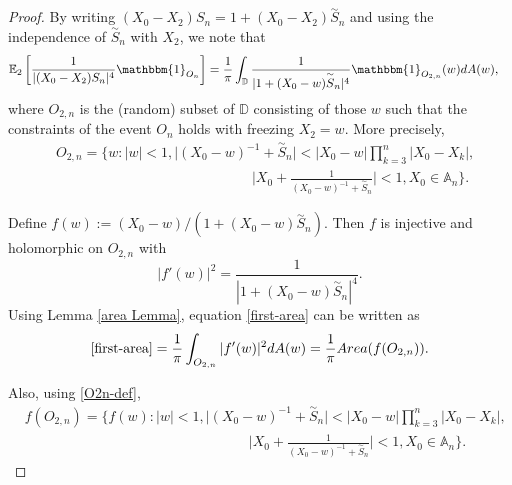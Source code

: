 \documentclass[9pt,a4paper,reqno]{amsart}
\newcommand{\E}{{\mathbb{E}}}
\newcommand{\tildea}[1]{\overset{\sim}{#1}}
\theoremstyle{mine}
\theoremstyle{definition}
\theoremstyle{remark}
\newcommand{\mb}{\mathbb}
\begin{document}
\begin{proof}
     By writing $(X_0 - X_2)S_n = 1 + (X_0 - X_2)\tildea{S}_n$ and using the independence of $\tildea{S}_n$ with $X_2$, we note that  
\begin{align}\label{first-area}
         \E_2\left[\frac{1}{|(X_0-X_2)S_n|^4} \mathbbm{1}_{O_n}\right] &= \frac{1}{\pi}\int_{\mathbb{D}} \frac{1}{|1+(X_0-w)\tildea{S}_n|^4}\mathbbm{1}_{O_{2,n}}(w)dA(w),
    \end{align}
where $O_{2,n}$ is the (random) subset of $\mb{D}$ consisting of those $w$ such that the constraints of the event $O_n$ holds with freezing $X_2 =w$. More precisely, 
 \begin{align}\label{O2n-def}
        &O_{2,n} = \biggl\{ w : |w| <1, \bigr| (X_0 -w)^{-1}+ \tildea{S}_n \bigl| < |X_0-w |\prod_{k=3}^n|X_0-X_k|, \\ & \qquad\qquad\qquad\qquad \qquad\qquad\qquad\biggl| X_0+ \frac{1}{(X_0 -w)^{-1}+\tildea{S}_n} \biggr|<1, X_0 \in \mb{A}_n \biggr\}.\nonumber
    \end{align}


Define $f(w) := (X_0-w)/(1+ (X_0-w)\tildea{S}_n)$. Then $f$ is  injective and holomorphic on $O_{2, n}$ with
\[ |f'(w)|^2 = \frac{1}{|1+ (X_0-w)\tildea{S}_n|^4}.\]
Using Lemma \ref{area Lemma}, equation \eqref{first-area} can be written as 
\begin{equation}\label{area-formula-once-again}
    \eqref{first-area}= \frac{1}{\pi}\int_{O_{2,n}} |f'(w)|^2 dA(w) = \frac{1}{\pi} Area(f(O_{2,n})).
\end{equation}

Also, using \eqref{O2n-def}, 
\begin{align}\label{f(K_n)}
        &f(O_{2,n}) = \Bigg\{ f(w) :  |w| <1, \bigl| (X_0-w)^{-1}+ \tildea{S}_n \bigr| < |X_0-w|\prod_{k=3}^n|X_0-X_k|,\\&  \qquad\qquad\qquad\qquad\qquad\qquad\qquad\qquad\biggl| X_0+ \frac{1}{(X_0-w)^{-1}+\tildea{S}_n} \biggr|<1, X_0 \in \mb{A}_n\Bigg \}. \nonumber
    \end{align}
    

\end{proof}
\end{document}
